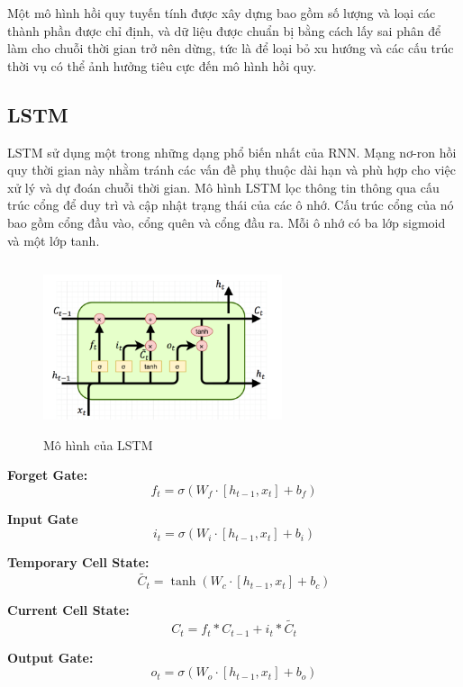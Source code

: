 \documentclass[conference]{IEEEtran}
\begin{document}
Một mô hình hồi quy tuyến tính được xây dựng bao gồm số lượng và loại các thành phần được chỉ định, và dữ liệu được chuẩn bị bằng cách lấy sai phân để làm cho chuỗi thời gian trở nên dừng, tức là để loại bỏ xu hướng và các cấu trúc thời vụ có thể ảnh hưởng tiêu cực đến mô hình hồi quy.

\subsection{\textbf{LSTM}}
LSTM sử dụng một trong những dạng phổ biến nhất của RNN. Mạng nơ-ron hồi quy thời gian này nhằm tránh các vấn đề phụ thuộc dài hạn và phù hợp cho việc xử lý và dự đoán chuỗi thời gian. Mô hình LSTM lọc thông tin thông qua cấu trúc cổng để duy trì và cập nhật trạng thái của các ô nhớ. Cấu trúc cổng của nó bao gồm cổng đầu vào, cổng quên và cổng đầu ra. Mỗi ô nhớ có ba lớp sigmoid và một lớp tanh.
\begin{figure}[H]
    \centering
    \includegraphics[width= 7cm, height= 5cm]{Images/lstm.png}
    \caption{Mô hình của LSTM}  
\end{figure}
\textbf{Forget Gate:}
\[
f_t = \sigma\left(W_f \cdot \left[ h_{t-1}, x_t \right] + b_f \right)
\]

 \textbf{Input Gate}
\[
i_t = \sigma\left(W_i \cdot \left[ h_{t-1}, x_t \right] + b_i \right)
\]

\textbf{Temporary Cell State:}
\[
\widetilde{C_t} = \tanh\left(W_c \cdot \left[ h_{t-1}, x_t \right] + b_c \right)
\]

\textbf{Current Cell State:}
\[
C_t = f_t \ast C_{t-1} + i_t \ast \widetilde{C_t}
\]

\textbf{ Output Gate:}
\[
o_t = \sigma\left(W_o \cdot \left[ h_{t-1}, x_t \right] + b_o \right)
\]
\end{document}
